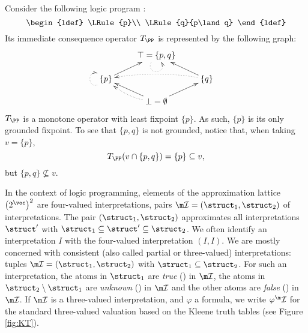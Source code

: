 \begin{example}
	Consider the following logic program \PP:
	\[	\begin{ldef}
			\LRule{p}\\
			\LRule{q}{p\land q}
		\end{ldef}
	\]
	Its immediate consequence operator $T_\PP$ is represented by the following graph:
	\[
		\xymatrix@R-1pc{
		& \top = \{p,q\} \ar@{.>}@/^/@(dl,dr)& \\
		\{p\}\ar[ru]\ar@{.>}@/^/@(dl,ul)      &&         \{q\}\ar[lu]\ar@{.>}@/_/[ll]\\
		& \bot = \emptyset\ar[ru]\ar[lu]\ar@{.>}@/^/[lu]
		}
	\]
	$T_\PP$ is a monotone operator with least fixpoint $\{p\}$. As such, $\{p\}$ is its only grounded fixpoint. 
	To see that $\{p,q\}$ is not grounded, notice that, when taking  $v=\{p\}$,
	\[T_\PP(v\cap \{p,q\}) = \{p\}\subseteq v,\]
	but $\{p,q\}\not\subseteq v$. 
\end{example}

	
	
	In the context of logic programming, elements of the approximation lattice $\left(2^\voc\right)^2$ are four-valued interpretations, pairs $\pstruct= (\struct_1,\struct_2)$ of interpretations.
The pair $(\struct_1,\struct_2)$ approximates all interpretations $\struct'$ with $\struct_1\subseteq \struct'\subseteq \struct_2$.
We often identify an interpretation $I$ with the four-valued interpretation $(I,I)$.
We are mostly concerned with consistent (also called partial or three-valued) interpretations: tuples $\pstruct=(\struct_1,\struct_2)$ with $\struct_1\subseteq\struct_2$. 
For such an interpretation, the atoms in $\struct_1$ are \emph{true} (\ltrue) in $\pstruct$, the atoms in $\struct_2\setminus\struct_1$ are \emph{unknown} (\lunkn) in $\pstruct$ and the other atoms are \emph{false} (\lfalse) in $\pstruct$. 
If $\pstruct$ is a three-valued interpretation, and $\varphi$ a formula, we write $\varphi^\pstruct$ for the standard three-valued valuation based on the Kleene truth tables (see Figure \ref{fig:KT}). 


